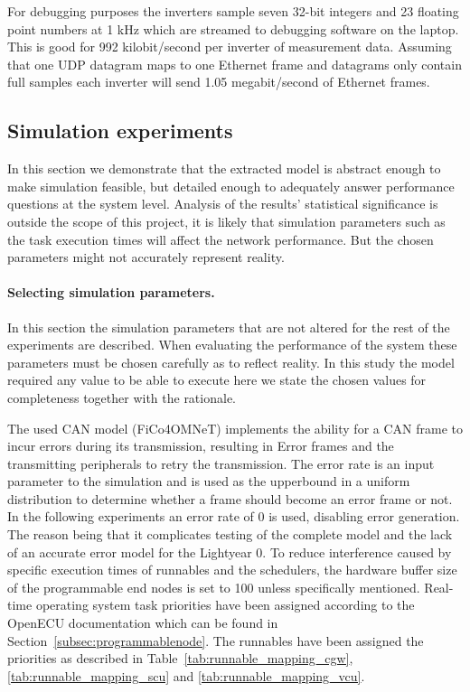 For debugging purposes the inverters sample seven 32-bit integers and 23 floating point numbers at 1 kHz which are streamed to debugging software on the laptop. This is good for 992 kilobit/second per inverter of measurement data. Assuming that one UDP datagram maps to one Ethernet frame and datagrams only contain full samples each inverter will send 1.05 megabit/second of Ethernet frames. 
\clearpage
\subsection{Simulation experiments}
\label{sec:experiments}
In this section we demonstrate that the extracted model is abstract enough to make simulation feasible, but detailed enough to adequately answer performance questions at the system level. Analysis of the results' statistical significance is outside the scope of this project, it is likely that simulation parameters such as the task execution times will affect the network performance. But the chosen parameters might not accurately represent reality. 

\paragraph{Selecting simulation parameters.}
In this section the simulation parameters that are not altered for the rest of the experiments are described. When evaluating the performance of the system these parameters must be chosen carefully as to reflect reality. In this study the model required any value to be able to execute here we state the chosen values for completeness together with the rationale.

The used CAN model (FiCo4OMNeT) implements the ability for a CAN frame to incur errors during its transmission, resulting in Error frames and the transmitting peripherals to retry the transmission. The error rate is an input parameter to the simulation and is used as the upperbound in a uniform distribution to determine whether a frame should become an error frame or not. In the following experiments an error rate of 0 is used, disabling error generation. The reason being that it complicates testing of the complete model and the lack of an accurate error model for the Lightyear 0. To reduce interference caused by specific execution times of runnables and the schedulers, the hardware buffer size of the programmable end nodes is set to 100 unless specifically mentioned. Real-time operating system task priorities have been assigned according to the OpenECU documentation which can be found in Section~\ref{subsec:programmablenode}. The runnables have been assigned the priorities as described in Table~\ref{tab:runnable_mapping_cgw},\ref{tab:runnable_mapping_scu} and \ref{tab:runnable_mapping_vcu}. 

